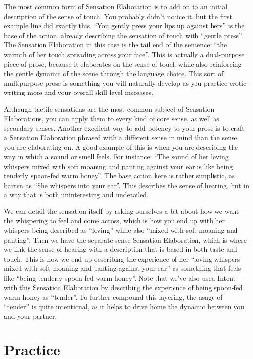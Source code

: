 \documentclass[Source-main.tex]{subfiles}
\begin{document}
The most common form of Sensation Elaboration is to add on to an initial description of the sense of touch.
You probably didn’t notice it, but the first example line did exactly this.
“You gently press your lips up against hers” is the base of the action, already describing the sensation of touch with “gentle press”.
The Sensation Elaboration in this case is the tail end of the sentence: “the warmth of her touch spreading across your face”.
This is actually a dual-purpose piece of prose, because it elaborates on the sense of touch while also reinforcing the gentle dynamic of the scene through the language choice.
This sort of multipurpose prose is something you will naturally develop as you practice erotic writing more and your overall skill level increases.

Although tactile sensations are the most common subject of Sensation Elaborations, you can apply them to every kind of core sense, as well as secondary senses.
Another excellent way to add potency to your prose is to craft a Sensation Elaboration phrased with a different sense in mind than the sense you are elaborating on.
A good example of this is when you are describing the way in which a sound or smell feels.
For instance: “The sound of her loving whispers mixed with soft moaning and panting against your ear is like being tenderly spoon-fed warm honey”.
The base action here is rather simplistic, as barren as “She whispers into your ear”.
This describes the sense of hearing, but in a way that is both uninteresting and undetailed.

We can detail the sensation itself by asking ourselves a bit about how we want the whispering to feel and come across, which is how you end up with her whispers being described as “loving” while also “mixed with soft moaning and panting”.
Then we have the separate sense Sensation Elaboration, which is where we link the sense of hearing with a description that is based in both taste and touch.
This is how we end up describing the experience of her “loving whispers mixed with soft moaning and panting against your ear” as something that feels like “being tenderly spoon-fed warm honey”.
Note that we’ve also used Intent with this Sensation Elaboration by describing the experience of being spoon-fed warm honey as “tender”.
To further compound this layering, the usage of “tender” is quite intentional, as it helps to drive home the dynamic between you and your partner.

\section{Practice}
\end{document}

